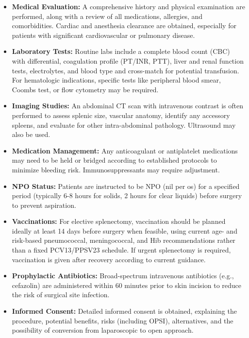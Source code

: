 \begin{itemize}
  \item \textbf{Medical Evaluation:} A comprehensive history and physical examination are performed, along with a review of all medications, allergies, and comorbidities. Cardiac and anesthesia clearance are obtained, especially for patients with significant cardiovascular or pulmonary disease.
  \item \textbf{Laboratory Tests:} Routine labs include a complete blood count (CBC) with differential, coagulation profile (PT/INR, PTT), liver and renal function tests, electrolytes, and blood type and cross-match for potential transfusion. For hematologic indications, specific tests like peripheral blood smear, Coombs test, or flow cytometry may be required.
  \item \textbf{Imaging Studies:} An abdominal CT scan with intravenous contrast is often performed to assess splenic size, vascular anatomy, identify any accessory spleens, and evaluate for other intra-abdominal pathology. Ultrasound may also be used.
  \item \textbf{Medication Management:} Any anticoagulant or antiplatelet medications may need to be held or bridged according to established protocols to minimize bleeding risk. Immunosuppressants may require adjustment.
  \item \textbf{NPO Status:} Patients are instructed to be NPO (nil per os) for a specified period (typically 6-8 hours for solids, 2 hours for clear liquids) before surgery to prevent aspiration.
  \item \textbf{Vaccinations:} For elective splenectomy, vaccination should be planned ideally at least 14 days before surgery when feasible, using current age- and risk-based pneumococcal, meningococcal, and Hib recommendations rather than a fixed PCV13/PPSV23 schedule. If urgent splenectomy is required, vaccination is given after recovery according to current guidance.
  \item \textbf{Prophylactic Antibiotics:} Broad-spectrum intravenous antibiotics (e.g., cefazolin) are administered within 60 minutes prior to skin incision to reduce the risk of surgical site infection.
  \item \textbf{Informed Consent:} Detailed informed consent is obtained, explaining the procedure, potential benefits, risks (including OPSI), alternatives, and the possibility of conversion from laparoscopic to open approach.
\end{itemize}

